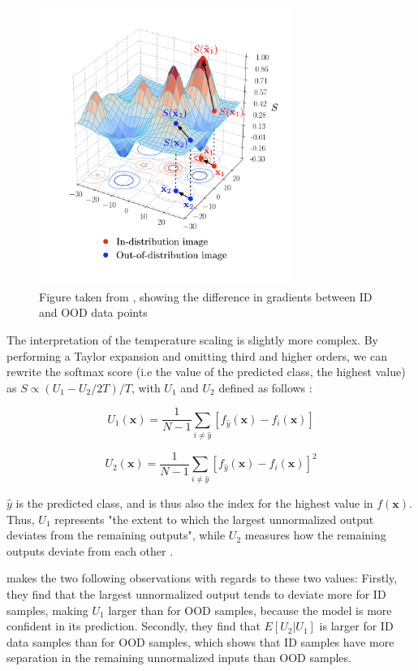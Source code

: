 \documentclass[conference]{IEEEtran}
\begin{document}
\begin{figure}[h]
\includegraphics[width=3.25in]{figure/gradient.pdf}
\caption{Figure taken from \cite{odin}, showing the difference in gradients between ID and OOD data points}
\label{softmaxmove}
\end{figure}

The interpretation of the temperature scaling is slightly more complex. By performing a Taylor expansion and omitting third and higher orders, we can rewrite the softmax score (i.e the value of the predicted class, the highest value) as ${S\propto {(U_{1}-U_{2}/2T)/T}}$, with $U_1$ and $U_2$ defined as follows \cite[4]{odin}:


\begin{equation}\label{eq::u1u2}
U_{1}(\bm{x})=\frac{1}{N-1}\sum_{i\neq\hat{y}}[f_{\hat{y}}(\bm{x})-f_{i}(\bm{x})]
\end{equation}

\begin{equation}\label{eq::u1u2}
U_{2}(\bm{x})=\frac{1}{N-1}\sum_{i\neq\hat{y}}[f_{\hat{y}}(\bm{x})-f_{i}(\bm{x})]^{2}
\end{equation}

$\hat{y}$ is the predicted class, and is thus also the index for the highest value in $f(\bm{x})$. Thus, $U_1$ represents "the extent to which the largest unnormalized output deviates from the remaining outputs", while $U_2$ measures how the remaining outputs deviate from each other \cite[6]{odin}.

\cite{odin} makes the two following observations with regards to these two values: Firstly, they find that the largest unnormalized output tends to deviate more for ID samples, making $U_1$ larger than for OOD samples, because the model is more confident in its prediction. Secondly, they find that $E[U_2|U_1]$ is larger for ID data samples than for OOD samples, which shows that ID samples have more separation in the remaining unnormalized inputs than OOD samples. 
\end{document}
